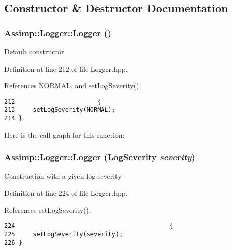 \subsection{Constructor \& Destructor Documentation}
\hypertarget{class_assimp_1_1_logger_784e6d1a741072b17bab32a6a41055e8}{
\subsubsection[Logger]{\setlength{\rightskip}{0pt plus 5cm}Assimp::Logger::Logger ()}}
\label{class_assimp_1_1_logger_784e6d1a741072b17bab32a6a41055e8}


Default constructor 

Definition at line 212 of file Logger.hpp.

References NORMAL, and setLogSeverity().

\begin{Code}\begin{verbatim}212                       {
213     setLogSeverity(NORMAL);
214 }
\end{verbatim}
\end{Code}




Here is the call graph for this function:\hypertarget{class_assimp_1_1_logger_ccc0ffea63ddf0982d8c2ba7e07f0716}{
\subsubsection[Logger]{\setlength{\rightskip}{0pt plus 5cm}Assimp::Logger::Logger ({\bf LogSeverity} {\em severity})}}
\label{class_assimp_1_1_logger_ccc0ffea63ddf0982d8c2ba7e07f0716}


Construction with a given log severity 

Definition at line 224 of file Logger.hpp.

References setLogSeverity().

\begin{Code}\begin{verbatim}224                                           {
225     setLogSeverity(severity);
226 }
\end{verbatim}
\end{Code}




